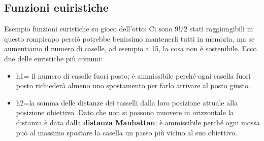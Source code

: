 \documentclass{article}
\begin{document}
\subsection{Funzioni euiristiche}
Esempio funzioni euristiche su gioco dell'otto: 
Ci sono $9!/2$ stati raggiungibili in questo rompicapo perciò potrebbe benissimo mantenerli tutti in memoria, ma se aumentiamo il numero di caselle, ad esempio a 15, la cosa non è sostenibile. Ecco due delle euristiche più comuni:
\begin{itemize}
    \item h1= il numero di caselle fuori posto; è ammissibile perché ogni casella fuori posto richiederà almeno uno spostamento per farlo arrivare al posto giusto.
    \item h2=la somma delle distanze dei tasselli dalla loro posizione attuale alla posizione obiettivo. Dato che non si possono muovere in orizzontale la distanza è data dalla \textbf{distanza Manhattan}; è ammissibile perché ogni mossa può al massimo spostare la casella un passo più vicino al suo obiettivo.
\end{itemize}


\end{document}
